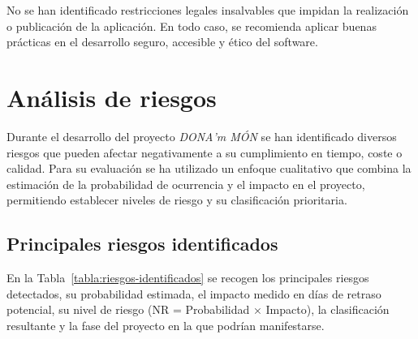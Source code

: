 No se han identificado restricciones legales insalvables que impidan la realización o publicación de la aplicación. En todo caso, se recomienda aplicar buenas prácticas en el desarrollo seguro, accesible y ético del software.
\section{Análisis de riesgos}

Durante el desarrollo del proyecto \textit{DONA'm MÓN} se han identificado diversos riesgos que pueden afectar negativamente a su cumplimiento en tiempo, coste o calidad. Para su evaluación se ha utilizado un enfoque cualitativo que combina la estimación de la probabilidad de ocurrencia y el impacto en el proyecto, permitiendo establecer niveles de riesgo y su clasificación prioritaria.

\subsection{Principales riesgos identificados}

En la Tabla~\ref{tabla:riesgos-identificados} se recogen los principales riesgos detectados, su probabilidad estimada, el impacto medido en días de retraso potencial, su nivel de riesgo (NR = Probabilidad × Impacto), la clasificación resultante y la fase del proyecto en la que podrían manifestarse.

\begin{table}[H]
\centering
\caption{Principales riesgos identificados}
\label{tabla:riesgos-identificados}
\end{table}


